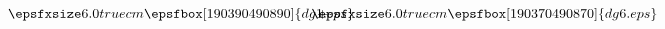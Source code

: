 \begin{equation}\label{One-Loop_Diagrams_Picture}
\qquad \smash{\epsfxsize6.0truecm\epsfbox[190 390 490 890]{dg1.eps}}
\hspace{-1cm}
+ \hspace{-0.5cm}
\smash{\epsfxsize6.0truecm\epsfbox[190 370 490 870]{dg6.eps}}
\end{equation}

